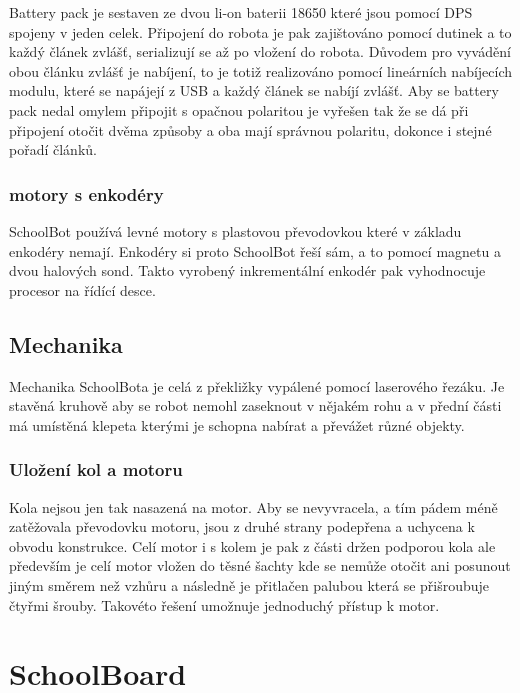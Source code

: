 \documentclass{template/socthesis}
\begin{document}
Battery pack je sestaven ze dvou li-on baterii 18650 které jsou pomocí DPS spojeny v jeden celek. Připojení do robota je pak zajištováno pomocí dutinek a to každý článek zvlášť, serializují se až po vložení do robota. Důvodem pro vyvádění obou článku zvlášť je nabíjení, to je totiž realizováno pomocí lineárních nabíjecích modulu, které se napájejí z USB a každý článek se nabíjí zvlášť.
Aby se battery pack nedal omylem připojit s opačnou polaritou je vyřešen tak že se dá při připojení otočit dvěma způsoby a oba mají správnou polaritu, dokonce i stejné pořadí článků.

\subsubsection{motory s enkodéry}

SchoolBot používá levné motory s plastovou převodovkou které v základu enkodéry nemají. Enkodéry si proto SchoolBot řeší sám, a to pomocí magnetu a dvou halových sond. Takto vyrobený inkrementální enkodér pak vyhodnocuje procesor na řídící desce.

\subsection{Mechanika}

Mechanika SchoolBota je celá z překližky vypálené pomocí laserového řezáku. Je stavěná kruhově aby se robot nemohl zaseknout v nějakém rohu a v přední části má umístěná klepeta kterými je schopna nabírat a převážet různé objekty. 

\subsubsection{Uložení kol a motoru}

Kola nejsou jen tak nasazená na motor. Aby se nevyvracela, a tím pádem méně zatěžovala převodovku motoru, jsou z druhé strany podepřena a uchycena k obvodu konstrukce.
Celí motor i s kolem je pak z části držen podporou kola ale především je celí motor vložen do těsné šachty kde se nemůže otočit ani posunout jiným směrem než vzhůru a následně je přitlačen palubou která se přišroubuje čtyřmi šrouby. Takovéto řešení umožnuje jednoduchý přístup k motor.

\newpage

\section{SchoolBoard}
\end{document}
